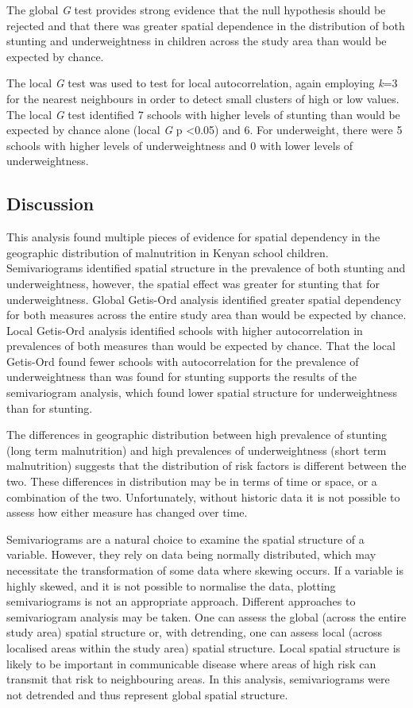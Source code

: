 \documentclass[11pt,a4paper,twoside]{article}\usepackage[]{graphicx}\usepackage[]{color}
\begin{document}
The global \textit{G} test provides strong evidence that the null hypothesis should be rejected and that there was greater spatial dependence in the distribution of both stunting and underweightness in children across the study area than would be expected by chance. 



The local \textit{G} test was used to test for local autocorrelation, again employing \textit{k}=3 for the nearest neighbours in order to detect small clusters of high or low values. 
The local \textit{G} test identified 7 schools with higher levels of stunting than would be expected by chance alone (local \textit{G} p \textless 0.05) and 6. 
For underweight, there were 5 schools with higher levels of underweightness and 0 with lower levels of underweightness. 

\subsection*{Discussion}
This analysis found multiple pieces of evidence for spatial dependency in the geographic distribution of malnutrition in Kenyan school children. 
Semivariograms identified spatial structure in the prevalence of both stunting and underweightness, however, the spatial effect was greater for stunting that for underweightness. 
Global Getis-Ord analysis identified greater spatial dependency for both measures across the entire study area than would be expected by chance. 
Local Getis-Ord analysis identified schools with higher autocorrelation in prevalences of both measures than would be expected by chance.
That the local Getis-Ord found fewer schools with autocorrelation for the prevalence of underweightness than was found for stunting supports the results of the semivariogram analysis, which found lower spatial structure for underweightness than for stunting. 

The differences in geographic distribution between high prevalence of stunting (long term malnutrition) and high prevalences of underweightness (short term malnutrition) suggests that the distribution of risk factors is different between the two. 
These differences in distribution may be in terms of time or space, or a combination of the two. 
Unfortunately, without historic data it is not possible to assess how either measure has changed over time. 

Semivariograms are a natural choice to examine the spatial structure of a variable.
However, they rely on data being normally distributed, which may necessitate the transformation of some data where skewing occurs. 
If a variable is highly skewed, and it is not possible to normalise the data, plotting semivariograms is not an appropriate approach. 
Different approaches to semivariogram analysis may be taken. 
One can assess the global (across the entire study area) spatial structure or, with detrending, one can assess local (across localised areas within the study area) spatial structure. \cite{Pullan2012}
Local spatial structure is likely to be important in communicable disease where areas of high risk can transmit that risk to neighbouring areas. 
In this analysis, semivariograms were not detrended and thus represent global spatial structure. 
\end{document}
